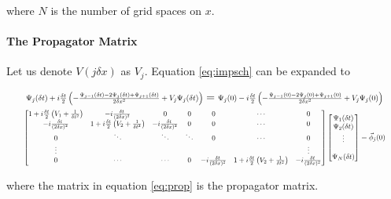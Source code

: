 where $N$ is the number of grid spaces on $x$.

\paragraph{The Propagator Matrix}

Let us denote $V(j \delta x)$ as $V_j$. Equation \eqref{eq:impsch} can be
expanded to

\begin{gather}
    \scalebox{0.7}{$
    \Psi_j(\delta t) + i\frac{\delta t}{2}
    \left(
    -\frac{\Psi_{j-1}(\delta t)-2\Psi_j(\delta t)+\Psi_{j+1}(\delta t)}
    {2 \delta x^2}
    + V_j \Psi_j(\delta t)
    \right)
    $}
    =
    \scalebox{0.7}{$
    \Psi_j(0) - i\frac{\delta t}{2}
    \left(
    -\frac{\Psi_{j-1}(0)-2\Psi_j(0)+\Psi_{j+1}(0)}
    {2 \delta x^2}
    + V_j \Psi_j(0)
    \right)
    $}
    \nonumber
    \\
    \scalebox{0.65}{$
    \begin{bmatrix}
        1 + i\frac{\delta t}{2}\left(V_1 + \frac{1}{\delta t^2}\right)
        &
        -i\frac{\delta t}{(2 \delta x)^2} & 0 & 0 & 0 & \cdots & 0 \\
        -i\frac{\delta t}{(2 \delta x)^2}
        &
        1 + i\frac{\delta t}{2}\left(V_2 + \frac{1}{\delta t^2}\right)
        & -i\frac{\delta t}{(2 \delta x)^2} & 0 & 0 & \cdots & 0 \\
        0 & \ddots & \ddots & \ddots & 0 & \cdots & 0 \\
        \vdots & & & & & & \vdots \\
        0 & \cdots & \cdots & 0 &
        -i\frac{\delta t}{(2 \delta x)^2}
        &
        1 + i\frac{\delta t}{2}\left(V_2 + \frac{1}{\delta t^2}\right)
        & -i\frac{\delta t}{(2 \delta x)^2}
    \end{bmatrix}
    \begin{bmatrix}
        \Psi_1(\delta t) \\
        \Psi_2(\delta t) \\
        \vdots \\
        \\
        \Psi_N(\delta t)
    \end{bmatrix}
    =
    \vec{\phi}_j(0)
    $}
    \label{eq:prop}
\end{gather}

where the matrix in equation \eqref{eq:prop} is the propagator matrix.

